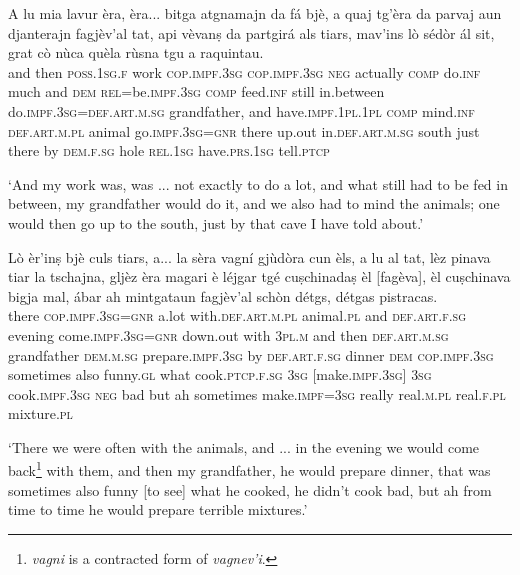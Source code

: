 \begin{linenumbers}
\gll A lu mia lavur èra, èra... bitga atgnamajn da fá bjè, a quaj tg’èra da parvaj aun djanterajn fagjèv’al tat, api vèvanṣ da partgirá als tiars, mav’ins lò sédòr ál sit, grat cò nùca quèla rùsna tgu a raquintau.\\
and then \textsc{poss.1sg.f} work \textsc{cop.impf.3sg} \textsc{cop.impf.3sg} \textsc{neg} actually \textsc{comp}  do.\textsc{inf} much and \textsc{dem} \textsc{rel=}be.\textsc{impf.3sg} \textsc{comp} feed.\textsc{inf} still in.between do.\textsc{impf.3sg}=\textsc{def.art.m.sg} grandfather, and have.\textsc{impf.1pl.1pl} \textsc{comp} mind.\textsc{inf} \textsc{def.art.m.pl} animal go.\textsc{impf.3sg=gnr} there up.out in.\textsc{def.art.m.sg} south just there by \textsc{dem.f.sg} hole \textsc{rel.1sg} have.\textsc{prs.1sg} tell.\textsc{ptcp}\\  
\end{linenumbers}
\medskip
\glt `And my work was, was ... not exactly to do a lot, and what still had to be fed in between, my grandfather would do it, and we also had to mind the animals; one would then go up to the south, just by that cave I have told about.'
\medskip

\begin{linenumbers}
\gll  Lò èr’inṣ bjè culs tiars, a... la sèra vagní gjùdòra cun èls, a lu al tat, lèz pinava tiar la tschajna, gljèz èra magari è léjgar  tgé cuṣchinadaṣ èl [fagèva], èl cuṣchinava bigja mal, ábar ah mintgataun fagjèv’al schòn détgs, détgas pistracas.  \\
there \textsc{cop.impf.3sg=gnr} a.lot  with.\textsc{def.art.m.pl} animal.\textsc{pl} and \textsc{def.art.f.sg} evening  come.\textsc{impf.3sg=gnr} down.out with \textsc{3pl.m} and then  \textsc{def.art.m.sg} grandfather  \textsc{dem.m.sg} prepare.\textsc{impf.3sg} by \textsc{def.art.f.sg} dinner \textsc{dem} \textsc{cop.impf.3sg} sometimes also funny.\textsc{gl} what cook.\textsc{ptcp.f.sg} \textsc{3sg} [make.\textsc{impf.3sg}]  \textsc{3sg} cook.\textsc{impf.3sg} \textsc{neg} bad but ah sometimes  make.\textsc{impf=3sg} really real.\textsc{m.pl} real.\textsc{f.pl} mixture.\textsc{pl}\\
\end{linenumbers}
\medskip
\glt `There we were often with the animals, and ... in the evening we would come back\footnote{\textit{vagni} is a contracted form of \textit{vagnev’i}.} with them, and then my grandfather, he would prepare dinner, that was sometimes also funny [to see] what he cooked, he didn’t cook bad, but ah from time to time he would prepare terrible mixtures.'
\medskip

